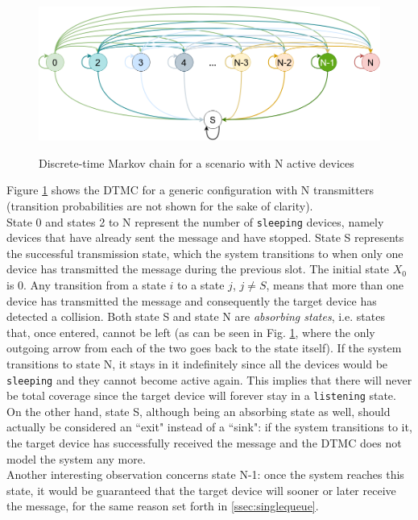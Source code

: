 \begin{figure}[H]%
    \centering
	{{\includegraphics[scale=0.4]{img/DTMC.png} }}%
    \caption{Discrete-time Markov chain for a scenario with N active devices}%
    \label{fig:dtmc}%
\end{figure}
\noindent Figure \ref{fig:dtmc} shows the DTMC for a generic configuration with N transmitters (transition probabilities are not shown for the sake of clarity).\\
State 0 and states 2 to N represent the number of \texttt{sleeping} devices, namely devices that have already sent the message and have stopped. 
State S represents the successful transmission state, which the system transitions to when only one device has transmitted the message during the previous slot.
The initial state $X_{0}$ is 0. Any transition from a state $i$ to a state $j$, $j \neq S$, means that more than one device has transmitted the message and consequently the target device has detected a collision.
Both state S and state N are \textit{absorbing states}, i.e. states that, once entered, cannot be left (as can be seen in Fig. \ref{fig:dtmc}, where the only outgoing arrow from each of the two goes back to the state itself).
If the system transitions to state N, it stays in it indefinitely since all the devices would be \texttt{sleeping} and they cannot become active again. This implies that there will never be total coverage since the target device will forever stay in a \texttt{listening} state.\\
On the other hand, state S, although being an absorbing state as well, should actually be considered an ``exit" instead of a ``sink": if the system transitions to it, the target device has successfully received the message and the DTMC does not model the system any more.\\
Another interesting observation concerns state N-1: once the system reaches this state, it would be guaranteed that the target device will sooner or later receive the message, for the same reason set forth in \ref{ssec:singlequeue}.
